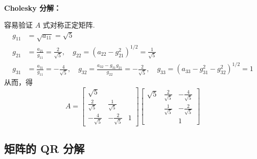             \begin{solution}
                \\ \textbf{Cholesky 分解：}
                \par 容易验证 $A$ 式对称正定矩阵.
                \begin{align*}
                    g_{11} &= \sqrt{a_{11}} = \sqrt{5} \\
                    g_{21} &= \frac{a_{21}}{g_{11}} = \frac{2}{\sqrt{5}}, \quad g_{22} = (a_{22} - g_{21}^2)^{1/2} = \frac{1}{\sqrt{5}} \\
                    g_{31} &= \frac{a_{31}}{g_{11}} = -\frac{4}{\sqrt{5}}, \quad g_{32} = \frac{a_{32} - g_{31}g_{21}}{g_{22}} = -\frac{2}{\sqrt{5}}, \quad g_{33} = (a_{33} - g_{31}^2 - g_{32}^2)^{1/2} = 1
                \end{align*}
                从而，得
                \begin{equation*}
                    A = \begin{bmatrix}
                        \sqrt{5} & & \\ \frac{2}{\sqrt{5}} & \frac{1}{\sqrt{5}} \\ -\frac{4}{\sqrt{5}} & -\frac{2}{\sqrt{5}} & 1
                    \end{bmatrix}\begin{bmatrix}
                        \sqrt{5} & \frac{2}{\sqrt{5}} & -\frac{4}{\sqrt{5}} \\  & \frac{1}{\sqrt{5}} & -\frac{2}{\sqrt{5}} \\  &  & 1
                    \end{bmatrix}
                \end{equation*}
            \end{solution}

    \subsection{矩阵的 QR 分解}
